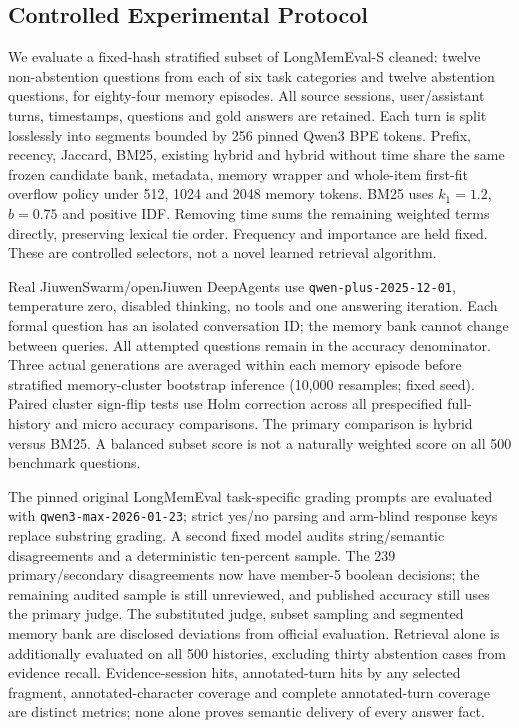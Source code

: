 \subsection{Controlled Experimental Protocol}
We evaluate a fixed-hash stratified subset of LongMemEval-S cleaned: twelve non-abstention questions from each of six task categories and twelve abstention questions, for eighty-four memory episodes. All source sessions, user/assistant turns, timestamps, questions and gold answers are retained. Each turn is split losslessly into segments bounded by 256 pinned Qwen3 BPE tokens. Prefix, recency, Jaccard, BM25, existing hybrid and hybrid without time share the same frozen candidate bank, metadata, memory wrapper and whole-item first-fit overflow policy under 512, 1024 and 2048 memory tokens. BM25 uses $k_1=1.2$, $b=0.75$ and positive IDF. Removing time sums the remaining weighted terms directly, preserving lexical tie order. Frequency and importance are held fixed. These are controlled selectors, not a novel learned retrieval algorithm.

Real JiuwenSwarm/openJiuwen DeepAgents use \texttt{qwen-plus-2025-12-01}, temperature zero, disabled thinking, no tools and one answering iteration. Each formal question has an isolated conversation ID; the memory bank cannot change between queries. All attempted questions remain in the accuracy denominator. Three actual generations are averaged within each memory episode before stratified memory-cluster bootstrap inference (10,000 resamples; fixed seed). Paired cluster sign-flip tests use Holm correction across all prespecified full-history and micro accuracy comparisons. The primary comparison is hybrid versus BM25. A balanced subset score is not a naturally weighted score on all 500 benchmark questions.

The pinned original LongMemEval task-specific grading prompts are evaluated with \texttt{qwen3-max-2026-01-23}; strict yes/no parsing and arm-blind response keys replace substring grading. A second fixed model audits string/semantic disagreements and a deterministic ten-percent sample. The 239 primary/secondary disagreements now have member-5 boolean decisions; the remaining audited sample is still unreviewed, and published accuracy still uses the primary judge. The substituted judge, subset sampling and segmented memory bank are disclosed deviations from official evaluation. Retrieval alone is additionally evaluated on all 500 histories, excluding thirty abstention cases from evidence recall. Evidence-session hits, annotated-turn hits by any selected fragment, annotated-character coverage and complete annotated-turn coverage are distinct metrics; none alone proves semantic delivery of every answer fact.

